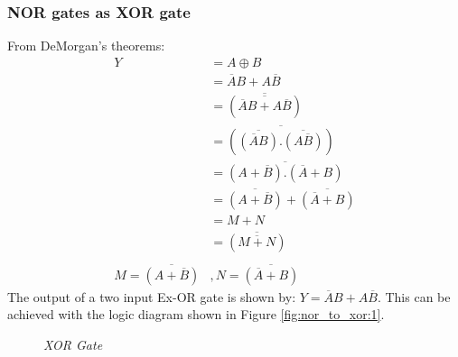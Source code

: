 		\subsubsection{NOR gates as XOR gate}
		From DeMorgan’s theorems:
		\begin{align*}
			Y &= A \oplus B \\
			&= \overline{A}B + A\overline{B} \\
			&= \overline{(\overline{\overline{A}B + A\overline{B}})} \\
			&= \overline{(\overline{(\overline{A}B)} . \overline{(A\overline{B})})} \\
			&= \overline{(A+\overline{B}) . (\overline{A} + B)} \\
			&= \overline{(A+\overline{B})} + \overline{(\overline{A} + B)} \\
			&= M + N \\
			&= \overline{(\overline{M+N})} \\
			\\
			M = \overline{(A+\overline{B})} &, N = \overline{(\overline{A} + B)}
		\end{align*}
		The output of a two input Ex-OR gate is shown by: $Y = \overline{A}B + A\overline{B}$. This can be achieved with the logic diagram shown in Figure \ref{fig:nor_to_xor:1}.
		\begin{figure}[ht]
			\centering
			\hfill
			\caption{\textit{XOR Gate}}
		\end{figure}
		
